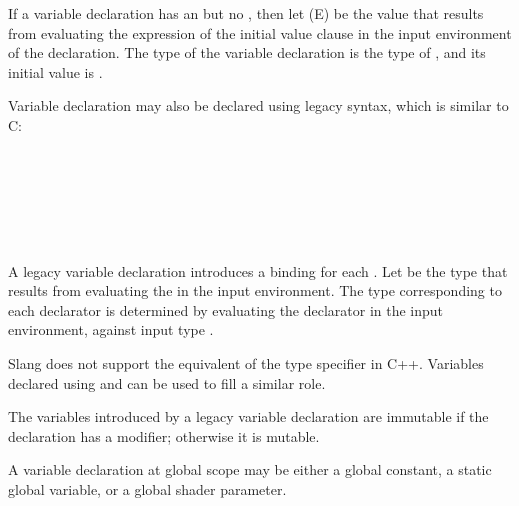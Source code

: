 If a variable declaration has an  but no , then let \MetaVar(E) be the value that results from evaluating the expression of the initial value clause in the input environment of the declaration.
The type of the variable declaration is the type of , and its initial value is .

\begin{Legacy}


Variable declaration may also be declared using legacy syntax, which is similar to C:

    \begin{Syntax}
         \\
             \\

         \\
              \SynStar \code{;} \\

         \\
              \SynOpt
    \end{Syntax}

A legacy variable declaration introduces a binding for each .
Let  be the type that results from evaluating the  in the input environment.
The type  corresponding to each declarator is determined by evaluating the declarator in the input environment, against input type .

\begin{Note}
Slang does not support the equivalent of the  type specifier in C++.
Variables declared using  and  can be used to fill a similar role.
\end{Note}

The variables introduced by a legacy variable declaration are immutable if the declaration has a  modifier; otherwise it is mutable.

\end{Legacy}


A variable declaration at global scope may be either a global constant, a static global variable, or a global shader parameter.

